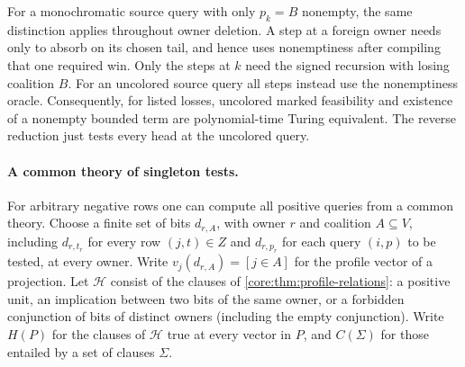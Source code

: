 For a monochromatic source query with only $p_k=B$
nonempty, the same distinction applies throughout
owner deletion. A step at a foreign owner needs
only to absorb on its chosen tail, and hence uses
nonemptiness after compiling that one required
win. Only the steps at $k$ need the signed recursion
with losing coalition $B$. For an uncolored source
query all steps instead use the nonemptiness oracle.
Consequently, for listed losses, uncolored marked
feasibility and existence of a nonempty bounded
term are polynomial-time Turing equivalent. The
reverse reduction just tests every head at the
uncolored query.

\paragraph{A common theory of singleton tests.}
For arbitrary negative rows one can compute all positive queries from
a common theory. Choose a finite set of bits $d_{r,A}$, with owner $r$
and coalition $A\subseteq V$, including $d_{r,t_r}$ for every row
$(j,t)\in Z$ and $d_{r,p_r}$ for each query $(i,p)$ to be tested,
at every owner. Write $v_j(d_{r,A})=[j\in A]$ for the profile vector
of a projection. Let $\mathcal H$ consist of the clauses of
\cref{core:thm:profile-relations}: a positive unit, an implication
between two bits of the same owner, or a forbidden conjunction of bits
of distinct owners (including the empty conjunction). Write $H(P)$
for the clauses of $\mathcal H$ true at every vector in $P$, and
$C(\Sigma)$ for those entailed by a set of clauses $\Sigma$.

